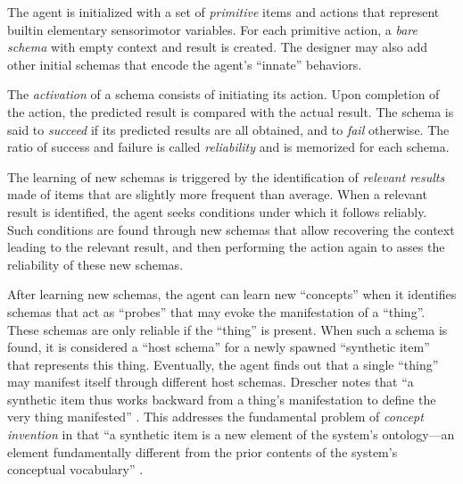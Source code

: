 \documentclass[runningheads]{llncs}
\begin{document}
The agent is initialized with a set of \textit{primitive} items and actions that represent builtin elementary sensorimotor variables. 
For each primitive action, a \textit{bare schema} with empty context and result is created. 
The designer may also add other initial schemas that encode the agent's ``innate'' behaviors. 

The \textit{activation} of a schema consists of initiating its action. 
Upon completion of the action, the predicted result is compared with the actual result.
The schema is said to \textit{succeed} if its predicted results are all obtained, and to \textit{fail} otherwise. 
The ratio of success and failure is called \textit{reliability} and is memorized for each schema.  

The learning of new schemas is triggered by the identification of \textit{relevant results} made of items that are slightly more frequent than average. 
When a relevant result is identified, the agent seeks conditions under which it follows reliably. 
Such conditions are found through new schemas that allow recovering the context leading to the relevant result, and then performing the action again to asses the reliability of these new schemas. 

After learning new schemas, the agent can learn new ``concepts'' when it identifies schemas that act as ``probes'' that may evoke the manifestation of a ``thing''. 
These schemas are only reliable if the ``thing'' is present. 
When such a schema is found, it is considered a ``host schema'' for a newly spawned ``synthetic item'' that represents this thing.
Eventually, the agent finds out that a single ``thing'' may manifest itself through different host schemas. 
Drescher notes that ``a synthetic item thus works backward from a thing's manifestation to define the very thing manifested'' \cite[p. 83]{drescher_made-up_1991}.
This addresses the fundamental problem of \textit{concept invention} in that 
``a synthetic item is a new element of the system's ontology---an element fundamentally different from the prior contents of the system's conceptual vocabulary'' \cite[p. 81]{drescher_made-up_1991}.
\end{document}
